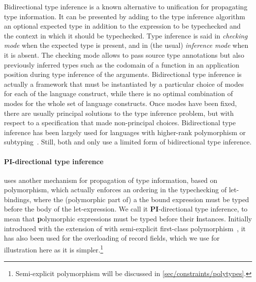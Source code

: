 \documentclass[acmsmall,screen,nonacm]{acmart}
\begin{document}
Bidirectional type inference is a known alternative to unification for
propagating type information. It can be presented by adding to the type
inference algorithm an optional expected type in addition to the expression
to be typechecked and the context in which it should be typechecked.  Type
inference is said in \emph{checking mode} when the expected type is present,
and in (the usual) \emph{inference mode} when it is absent. The checking
mode allows to pass source type annotations but also previously inferred
types such as the codomain of a function in an application position during
type inference of the arguments.
%
Bidirectional type inference is actually a framework that must be
instantiated by a particular choice of modes for each of the language
construct, while there is no optimal combination of modes for the whole set
of language constructs. Once modes have been fixed, there are usually
principal solutions to the type inference problem, but with respect to a
specification that made non-principal choices.
%
Bidirectional type inference has been largely used for languages with
higher-rank polymorphism or subtyping~. Still, both \OCaml
and \Haskell only use a limited form of bidirectional type inference.


\paragraph{PI-directional type inference}

\OCaml uses another mechanism for propagation of type information,
based on polymorphism, which actually enforces an ordering in the
typechecking of let-bindings, where the (polymorphic part of) a the
bound expression must be typed before the body of the let-expression.
We call it \textbf{PI}-directional type inference, to mean that
\textbf polymorphic expressions must be typed before their \textbf
instances.  Initially introduced with the extension of \ML with
semi-explicit first-class polymorphism~\cite {Garrigue-Remy/poly-ml},
it has also been used for the overloading of record fields, which we
use for illustration here as it is simpler.\footnote {Semi-explicit
  polymorphism will be discussed in \cref{sec/constraints/polytypes}.}
\end{document}
